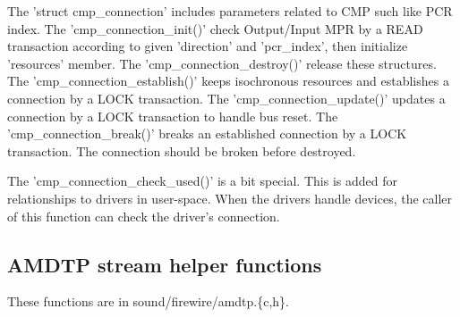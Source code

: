 \documentclass[onecolumn]{jarticle}
\begin{document}
The 'struct cmp\_connection' includes parameters related to CMP such like PCR index. The 'cmp\_connection\_init()' check Output/Input MPR by a READ transaction according to given 'direction' and 'pcr\_index', then initialize 'resources' member. The 'cmp\_connection\_destroy()' release these structures. The 'cmp\_connection\_establish()' keeps isochronous resources and establishes a connection by a LOCK transaction. The 'cmp\_connection\_update()' updates a connection by a LOCK transaction to handle bus reset. The 'cmp\_connection\_break()' breaks an established connection by a LOCK transaction. The connection should be broken before destroyed.

The 'cmp\_connection\_check\_used()' is a bit special. This is added for relationships to drivers in user-space. When the drivers handle devices, the caller of this function can check the driver's connection.

\subsection{AMDTP stream helper functions}

These functions are in sound/firewire/amdtp.\{c,h\}.
\end{document}
